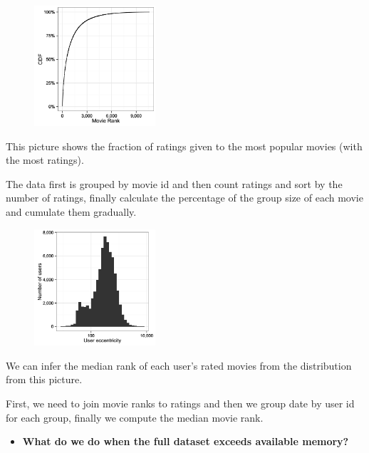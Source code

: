 \begin{figure}[ht]
  \begin{center}
    \includegraphics[width=0.4\textwidth]{figures/scribe_notes_3.png}
    \label{fig:scribe_notes_3}
  \end{center}
\end{figure}
This picture shows the fraction of ratings given to the most popular movies (with the most ratings).

The data first is grouped by movie id and then count ratings and sort by the number of ratings, finally calculate the percentage of the group size of each movie and cumulate them gradually.
\newpage
\begin{figure}[ht]
  \begin{center}
    \includegraphics[width=0.4\textwidth]{figures/scribe_notes_4.png}
    \label{fig:scribe_notes_4}
  \end{center}
\end{figure}
We can infer the median rank of each user’s rated movies from the distribution from this picture.

First, we need to join movie ranks to ratings and then we group date by user id for each group, finally we compute the median movie rank.
~\\


\begin{itemize}
\item \textbf{What do we do when the full dataset exceeds available memory?}
\end{itemize}


